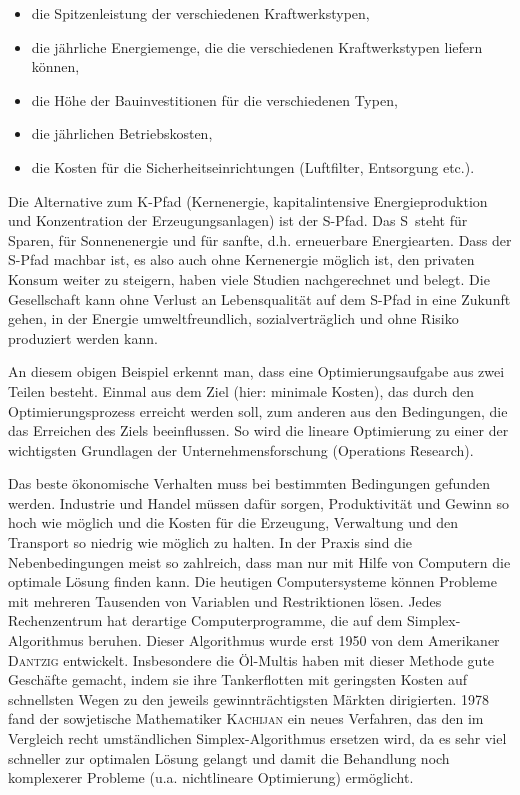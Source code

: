 \documentclass[%
11pt,%
twoside,%
titlepage,%
german,%
headsepline%
]{scrartcl}
\begin{document}
\begin{itemize}
\item die Spitzenleistung der verschiedenen Kraftwerkstypen,
\item die j\"ahrliche Energiemenge, die die verschiedenen Kraftwerkstypen liefern k\"onnen,
\item die H\"ohe der Bauinvestitionen f\"ur die verschiedenen Typen,
\item die j\"ahrlichen Betriebskosten,
\item die Kosten f\"ur die Sicherheitseinrichtungen (Luftfilter, Entsorgung etc.).
\end{itemize}

\begin{bem}
Die Alternative zum K-Pfad (Kernenergie, kapitalintensive Energieproduktion und Konzentration der Erzeugungsanlagen) ist der S-Pfad. Das \glqq S\grqq\ steht f\"ur Sparen, f\"ur Sonnenenergie und f\"ur sanfte, d.h. erneuerbare Energiearten. Dass der S-Pfad machbar ist, es also auch ohne Kernenergie m\"oglich ist, den privaten Konsum weiter zu steigern, haben viele Studien nachgerechnet und belegt. Die Gesellschaft kann ohne Verlust an Lebensqualit\"at auf dem S-Pfad in eine Zukunft gehen, in der Energie umweltfreundlich, sozialvertr\"aglich und ohne Risiko produziert werden kann.
\end{bem}

An diesem obigen Beispiel erkennt man, dass eine Optimierungsaufgabe aus zwei Teilen besteht. Einmal aus dem Ziel (hier: minimale Kosten), das durch den Optimierungsprozess erreicht werden soll, zum anderen aus den Bedingungen, die das Erreichen des Ziels beeinflussen. So wird die lineare Optimierung zu einer der wichtigsten Grundlagen der Unternehmensforschung (Operations Research).

Das beste \"okonomische Verhalten muss bei bestimmten Bedingungen gefunden werden. Industrie und Handel m\"ussen daf\"ur sorgen, Produktivit\"at und Gewinn so hoch wie m\"oglich und die Kosten f\"ur die Erzeugung, Verwaltung und den Transport so niedrig wie m\"oglich zu halten. In der Praxis sind die Nebenbedingungen meist so zahlreich, dass man nur mit Hilfe von Computern die optimale L\"osung finden kann. Die heutigen Computersysteme k\"onnen Probleme mit mehreren Tausenden von Variablen und Restriktionen l\"osen. Jedes Rechenzentrum hat derartige Computerprogramme, die auf dem Simplex-Algorithmus beruhen. Dieser Algorithmus wurde erst 1950 von dem Amerikaner \textsc{Dantzig} entwickelt. Insbesondere die \"Ol-Multis haben mit dieser Methode gute Gesch\"afte gemacht, indem sie ihre Tankerflotten mit geringsten Kosten auf schnellsten Wegen zu den jeweils gewinntr\"achtigsten M\"arkten dirigierten. 1978 fand der sowjetische Mathematiker \textsc{Kachijan} ein neues Verfahren, das den im Vergleich recht umst\"andlichen Simplex-Algorithmus ersetzen wird, da es sehr viel schneller zur optimalen L\"osung gelangt und damit die Behandlung noch komplexerer Probleme (u.a. nichtlineare Optimierung) erm\"oglicht.
\end{document}

